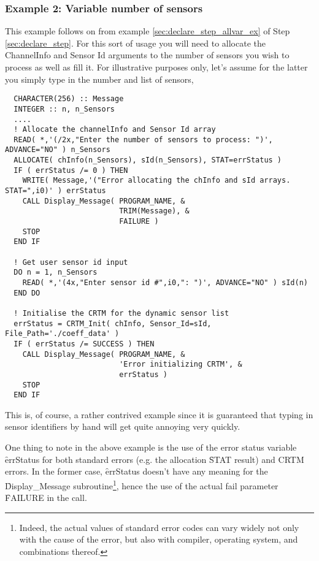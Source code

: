 \subsubsection{Example 2: Variable number of sensors}
This example follows on from example \ref{sec:declare_step_allvar_ex} of Step \ref{sec:declare_step}. For this sort of usage you will need to allocate the ChannelInfo and Sensor Id arguments to the number of sensors you wish to process as well as fill it. For illustrative purposes only, let's assume for the latter you simply type in the number and list of sensors,
\begin{ttfamily}
  \begin{verbatim}
  CHARACTER(256) :: Message
  INTEGER :: n, n_Sensors
  ....
  ! Allocate the channelInfo and Sensor Id array
  READ( *,'(/2x,"Enter the number of sensors to process: ")', ADVANCE="NO" ) n_Sensors
  ALLOCATE( chInfo(n_Sensors), sId(n_Sensors), STAT=errStatus )
  IF ( errStatus /= 0 ) THEN
    WRITE( Message,'("Error allocating the chInfo and sId arrays. STAT=",i0)' ) errStatus
    CALL Display_Message( PROGRAM_NAME, &
                          TRIM(Message), & 
                          FAILURE )
    STOP
  END IF
  
  ! Get user sensor id input
  DO n = 1, n_Sensors
    READ( *,'(4x,"Enter sensor id #",i0,": ")', ADVANCE="NO" ) sId(n)
  END DO
  
  ! Initialise the CRTM for the dynamic sensor list
  errStatus = CRTM_Init( chInfo, Sensor_Id=sId, File_Path='./coeff_data' )
  IF ( errStatus /= SUCCESS ) THEN 
    CALL Display_Message( PROGRAM_NAME, &
                          'Error initializing CRTM', & 
                          errStatus )
    STOP
  END IF\end{verbatim}
\end{ttfamily}
This is, of course, a rather contrived example since it is guaranteed that typing in sensor identifiers by hand will get quite annoying very quickly.

One thing to note in the above example is the use of the error status variable \f{errStatus} for both standard errors (e.g. the allocation \f{STAT} result) and CRTM errors. In the former case, \f{errStatus} doesn't have any meaning for the \f{Display\_Message} subroutine\footnote{Indeed, the actual values of standard error codes can vary widely not only with the cause of the error, but also with compiler, operating system, and combinations thereof.}, hence the use of the actual fail parameter \f{FAILURE} in the call.


